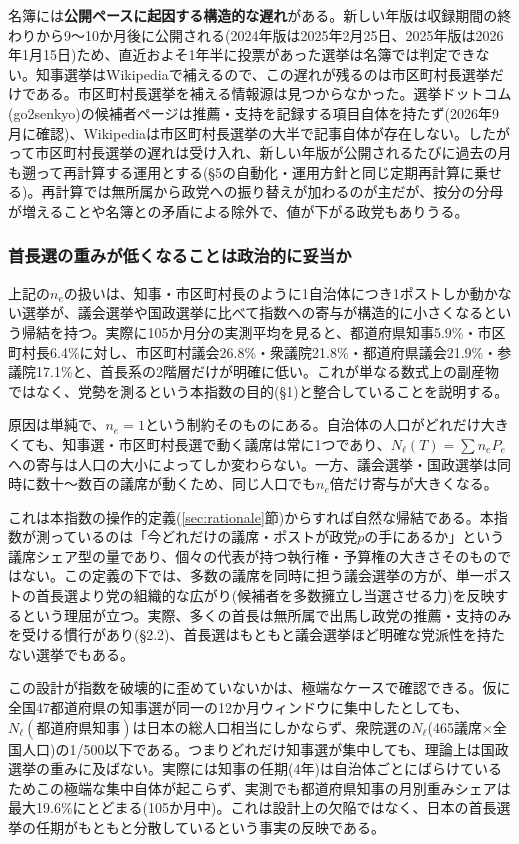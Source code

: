 \documentclass[a4paper,11pt]{ltjsarticle}
\begin{document}
名簿には\textbf{公開ペースに起因する構造的な遅れ}がある。新しい年版は収録期間の終わりから9〜10か月後に公開される(2024年版は2025年2月25日、2025年版は2026年1月15日)ため、直近およそ1年半に投票があった選挙は名簿では判定できない。知事選挙はWikipediaで補えるので、この遅れが残るのは市区町村長選挙だけである。市区町村長選挙を補える情報源は見つからなかった。選挙ドットコム(go2senkyo)の候補者ページは推薦・支持を記録する項目自体を持たず(2026年9月に確認)、Wikipediaは市区町村長選挙の大半で記事自体が存在しない。したがって市区町村長選挙の遅れは受け入れ、新しい年版が公開されるたびに過去の月も遡って再計算する運用とする(\S5の自動化・運用方針と同じ定期再計算に乗せる)。再計算では無所属から政党への振り替えが加わるのが主だが、按分の分母が増えることや名簿との矛盾による除外で、値が下がる政党もありうる。

\subsubsection{首長選の重みが低くなることは政治的に妥当か}

上記の$n_e$の扱いは、知事・市区町村長のように1自治体につき1ポストしか動かない選挙が、議会選挙や国政選挙に比べて指数への寄与が構造的に小さくなるという帰結を持つ。実際に105か月分の実測平均を見ると、都道府県知事5.9\%・市区町村長6.4\%に対し、市区町村議会26.8\%・衆議院21.8\%・都道府県議会21.9\%・参議院17.1\%と、首長系の2階層だけが明確に低い。これが単なる数式上の副産物ではなく、党勢を測るという本指数の目的(\S1)と整合していることを説明する。

原因は単純で、$n_e=1$という制約そのものにある。自治体の人口がどれだけ大きくても、知事選・市区町村長選で動く議席は常に1つであり、$N_\ell(T)=\sum n_eP_e$への寄与は人口の大小によってしか変わらない。一方、議会選挙・国政選挙は同時に数十〜数百の議席が動くため、同じ人口でも$n_e$倍だけ寄与が大きくなる。

これは本指数の操作的定義(\ref{sec:rationale}節)からすれば自然な帰結である。本指数が測っているのは「今どれだけの議席・ポストが政党$p$の手にあるか」という議席シェア型の量であり、個々の代表が持つ執行権・予算権の大きさそのものではない。この定義の下では、多数の議席を同時に担う議会選挙の方が、単一ポストの首長選より党の組織的な広がり(候補者を多数擁立し当選させる力)を反映するという理屈が立つ。実際、多くの首長は無所属で出馬し政党の推薦・支持のみを受ける慣行があり(\S2.2)、首長選はもともと議会選挙ほど明確な党派性を持たない選挙でもある。

この設計が指数を破壊的に歪めていないかは、極端なケースで確認できる。仮に全国47都道府県の知事選が同一の12か月ウィンドウに集中したとしても、$N_\ell(\text{都道府県知事})$は日本の総人口相当にしかならず、衆院選の$N_\ell$(465議席×全国人口)の1/500以下である。つまりどれだけ知事選が集中しても、理論上は国政選挙の重みに及ばない。実際には知事の任期(4年)は自治体ごとにばらけているためこの極端な集中自体が起こらず、実測でも都道府県知事の月別重みシェアは最大19.6\%にとどまる(105か月中)。これは設計上の欠陥ではなく、日本の首長選挙の任期がもともと分散しているという事実の反映である。
\end{document}
